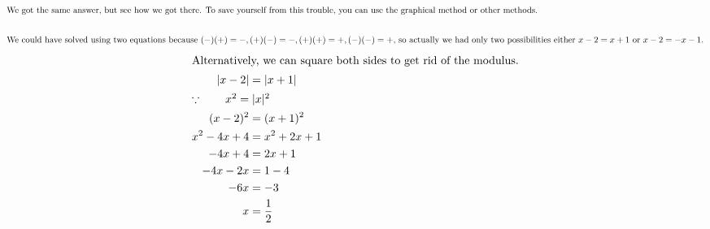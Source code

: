 \begin{enumerate}
\begin{align*}
            \intertext{We got the same answer, but see how we got there. To save yourself from this trouble, you can use the graphical method or other methods.}\\
            \intertext{We could have solved using two equations because \( (-)(+) = -, (+)(-) = -, (+)(+)= +, (-)(-) = +\), so actually we had only two possibilities either \(x-2 = x+1\) or \(x-2 = -x-1\).}
        \end{align*}
        \begin{align*}
            \intertext{Alternatively, we can square both sides to get rid of the modulus.}
            |x-2| &= |x+1|\\
            \intertext{$\because \qquad x^2=|x|^2$}
            (x-2)^2 &= (x+1)^2\\
            x^2-4x+4 &= x^2+2x+1\\
            -4x+4 &= 2x+1\\
            -4x-2x &= 1-4\\
            -6x &= -3\\
            x &= \frac{1}{2}
        \end{align*}
\end{enumerate}
    


